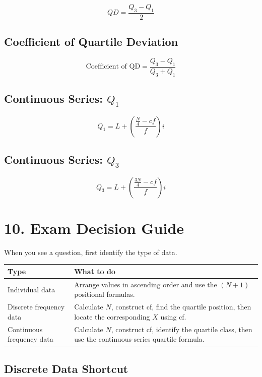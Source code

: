 \documentclass[12pt,a4paper]{article}
\newcommand{\boxformula}[1]{%
\[
\boxed{\displaystyle #1}
\]
}
\begin{document}
\boxformula{
QD=\frac{Q_3-Q_1}{2}
}

\subsection*{Coefficient of Quartile Deviation}

\boxformula{
\text{Coefficient of QD}
=
\frac{Q_3-Q_1}{Q_3+Q_1}
}

\subsection*{Continuous Series: $Q_1$}

\boxformula{
Q_1
=
L+
\left(
\frac{\frac N4-cf}{f}
\right)i
}

\subsection*{Continuous Series: $Q_3$}

\boxformula{
Q_3
=
L+
\left(
\frac{\frac{3N}{4}-cf}{f}
\right)i
}

\section{10. Exam Decision Guide}

When you see a question, first identify the type of data.

\begin{center}
\begin{tabular}{p{4cm}p{8cm}}
\toprule
\textbf{Type} & \textbf{What to do} \\
\midrule
Individual data &
Arrange values in ascending order and use the $(N+1)$ positional formulas.\\
\addlinespace
Discrete frequency data &
Calculate $N$, construct cf, find the quartile position, then locate the
corresponding $X$ using cf.\\
\addlinespace
Continuous frequency data &
Calculate $N$, construct cf, identify the quartile class, then use the
continuous-series quartile formula.\\
\bottomrule
\end{tabular}
\end{center}

\subsection*{Discrete Data Shortcut}
\end{document}
